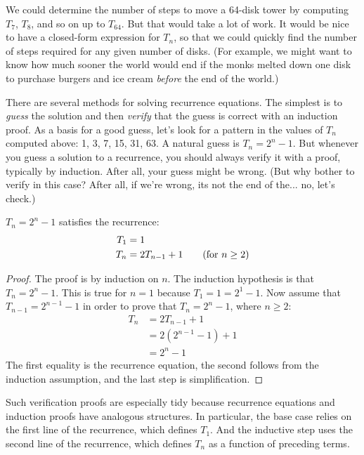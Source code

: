 We could determine the number of steps to move a 64-disk tower by
computing $T_7$, $T_8$, and so on up to $T_{64}$.  But that would take
a lot of work.  It would be nice to have a closed-form expression for
$T_n$, so that we could quickly find the number of steps required for
any given number of disks. (For example, we might want to know how
much sooner the world would end if the monks melted down one disk to
purchase burgers and ice cream \emph{before} the end of the world.)

There are several methods for solving recurrence equations.  The
simplest is to \emph{guess} the solution and then \emph{verify} that the
guess is correct with an induction proof.  As a basis for a good
guess, let's look for a pattern in the values of $T_n$ computed above:
1, 3, 7, 15, 31, 63.  A natural guess is $T_n = 2^n - 1$.  But
whenever you guess a solution to a recurrence, you should always
verify it with a proof, typically by induction.  After all, your guess
might be wrong. (But why bother to verify in this case?  After all, if
we're wrong, its not the end of the... no, let's check.)

\begin{claim}
$T_n = 2^n - 1$ satisfies the recurrence:
\begin{align*}
T_1 & = 1 \\
T_n & = 2T_{n-1} + 1 \text{\qquad (for $n \geq 2$)}
\end{align*}
\end{claim}
\begin{proof}
  The proof is by induction on $n$.  The induction hypothesis is that
  $T_n = 2^n - 1$.  This is true for $n = 1$ because $T_1 = 1 = 2^1 -
  1$.  Now assume that $T_{n-1} = 2^{n-1} - 1$ in order to prove
  that $T_n = 2^n - 1$, where $n \geq 2$:
\begin{align*}
T_{n} & = 2 T_{n-1} + 1 \\
  & = 2 (2^{n-1} - 1) + 1 \\
  & = 2^n - 1
\end{align*}
The first equality is the recurrence equation, the second follows from
the induction assumption, and the last step is simplification.
\end{proof}

Such verification proofs are especially tidy because recurrence
equations and induction proofs have analogous structures.  In
particular, the base case relies on the first line of the recurrence,
which defines $T_1$.  And the inductive step uses the second line of
the recurrence, which defines $T_n$ as a function of preceding terms.

